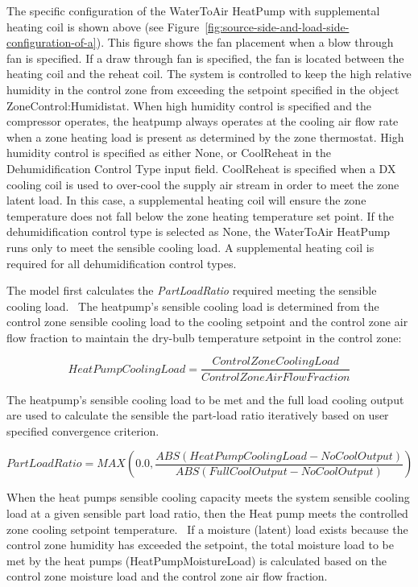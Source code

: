 The specific configuration of the WaterToAir HeatPump with supplemental heating coil is shown above (see Figure~\ref{fig:source-side-and-load-side-configuration-of-a}). This figure shows the fan placement when a blow through fan is specified. If a draw through fan is specified, the fan is located between the heating coil and the reheat coil. The system is controlled to keep the high relative humidity in the control zone from exceeding the setpoint specified in the object ZoneControl:Humidistat. When high humidity control is specified and the compressor operates, the heatpump always operates at the cooling air flow rate when a zone heating load is present as determined by the zone thermostat. High humidity control is specified as either None, or CoolReheat in the Dehumidification Control Type input field. CoolReheat is specified when a DX cooling coil is used to over-cool the supply air stream in order to meet the zone latent load. In this case, a supplemental heating coil will ensure the zone temperature does not fall below the zone heating temperature set point. If the dehumidification control type is selected as None, the WaterToAir HeatPump runs only to meet the sensible cooling load. A supplemental heating coil is required for all dehumidification control types.

The model first calculates the \emph{PartLoadRatio} required meeting the sensible cooling load.~ The heatpump's sensible cooling load is determined from the control zone sensible cooling load to the cooling setpoint and the control zone air flow fraction to maintain the dry-bulb temperature setpoint in the control zone:

\begin{equation}
HeatPumpCoolingLoad = \frac{{ControlZoneCoolingLoad}}{{ControlZoneAirFlowFraction}}
\end{equation}

The heatpump's sensible cooling load to be met and the full load cooling output are used to calculate the sensible the part-load ratio iteratively based on user specified convergence criterion.

\begin{equation}
PartLoadRatio = MAX\left( {0.0,\frac{{ABS\left( {HeatPumpCoolingLoad - NoCoolOutput} \right)}}{{ABS\left( {FullCoolOutput - NoCoolOutput} \right)}}} \right)
\end{equation}

When the heat pumps sensible cooling capacity meets the system sensible cooling load at a given sensible part load ratio, then the Heat pump meets the controlled zone cooling setpoint temperature.~ If a moisture (latent) load exists because the control zone humidity has exceeded the setpoint, the total moisture load to be met by the heat pumps (HeatPumpMoistureLoad) is calculated based on the control zone moisture load and the control zone air flow fraction.

